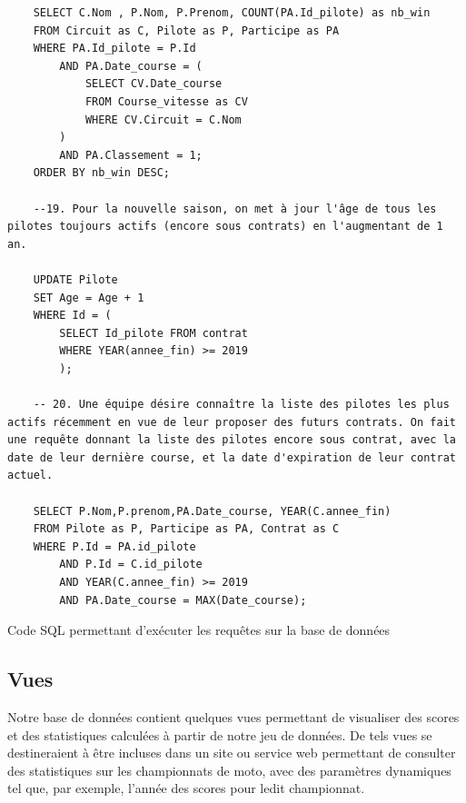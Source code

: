 \documentclass[12pt,a4paper]{article}
\newenvironment{code}{\captionsetup{type=listing}}{}
\begin{document}
\begin{code}
\begin{verbatim}
    SELECT C.Nom , P.Nom, P.Prenom, COUNT(PA.Id_pilote) as nb_win
    FROM Circuit as C, Pilote as P, Participe as PA
    WHERE PA.Id_pilote = P.Id
        AND PA.Date_course = (
            SELECT CV.Date_course
            FROM Course_vitesse as CV
            WHERE CV.Circuit = C.Nom
        )
        AND PA.Classement = 1;
    ORDER BY nb_win DESC;

    --19. Pour la nouvelle saison, on met à jour l'âge de tous les pilotes toujours actifs (encore sous contrats) en l'augmentant de 1 an.

    UPDATE Pilote
    SET Age = Age + 1
    WHERE Id = (
        SELECT Id_pilote FROM contrat
        WHERE YEAR(annee_fin) >= 2019
        );

    -- 20. Une équipe désire connaître la liste des pilotes les plus actifs récemment en vue de leur proposer des futurs contrats. On fait une requête donnant la liste des pilotes encore sous contrat, avec la date de leur dernière course, et la date d'expiration de leur contrat actuel.

    SELECT P.Nom,P.prenom,PA.Date_course, YEAR(C.annee_fin)
    FROM Pilote as P, Participe as PA, Contrat as C
    WHERE P.Id = PA.id_pilote
        AND P.Id = C.id_pilote
        AND YEAR(C.annee_fin) >= 2019
        AND PA.Date_course = MAX(Date_course);
    \end{verbatim}
    \caption{Code SQL permettant d'exécuter les requêtes sur la base de données}
    \label{lst.request}
\end{code}

\subsection{Vues}
\label{sub.views}

Notre base de données contient quelques vues permettant de visualiser des scores
et des statistiques calculées à partir de notre jeu de données. De tels vues se
destineraient à être incluses dans un site ou service web permettant de consulter
des statistiques sur les championnats de moto, avec des paramètres dynamiques
tel que, par exemple, l'année des scores pour ledit championnat.
\end{document}
